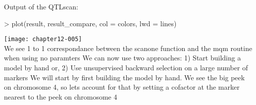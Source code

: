 \documentclass[a4paper]{article}
\begin{document}
Output of the QTLscan:
\\
\begin{Schunk}
\begin{Sinput}
> plot(result, result_compare, col = colors, lwd = lines)
\end{Sinput}
\end{Schunk}
\texttt{[image: chapter12-005]}
\\
We see 1 to 1 correspondance between the scanone function and the mqm routine when using no paramters
We can now use two approaches:
1) Start building a model by hand or,
2) Use unsupervised backward selection on a large number of markers
We will start by first building the model by hand. We see the big peek on chromosome 4,
so lets account for that by setting a cofactor at the marker nearest to the peek on chromosome 4
\\
\end{document}
